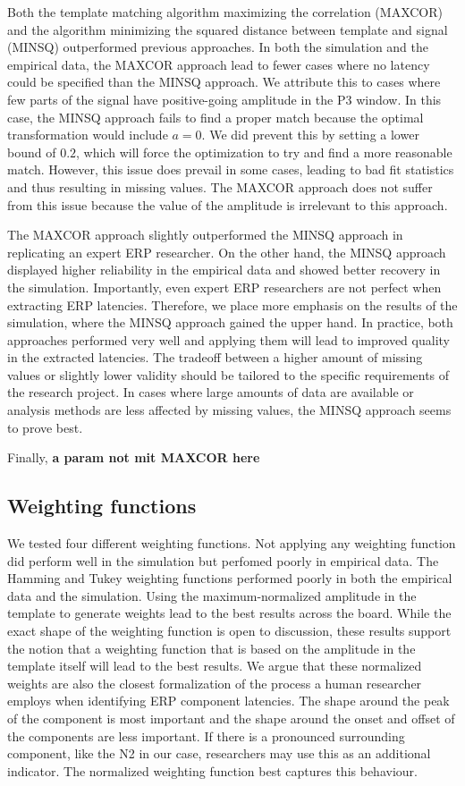 \documentclass[
  man]{apa7}
\begin{document}
Both the template matching algorithm maximizing the correlation (MAXCOR) and the algorithm minimizing the squared distance between template and signal (MINSQ) outperformed previous approaches. In both the simulation and the empirical data, the MAXCOR approach lead to fewer cases where no latency could be specified than the MINSQ approach. We attribute this to cases where few parts of the signal have positive-going amplitude in the P3 window. In this case, the MINSQ approach fails to find a proper match because the optimal transformation would include \(a = 0\). We did prevent this by setting a lower bound of \(0.2\), which will force the optimization to try and find a more reasonable match. However, this issue does prevail in some cases, leading to bad fit statistics and thus resulting in missing values. The MAXCOR approach does not suffer from this issue because the value of the amplitude is irrelevant to this approach.

The MAXCOR approach slightly outperformed the MINSQ approach in replicating an expert ERP researcher. On the other hand, the MINSQ approach displayed higher reliability in the empirical data and showed better recovery in the simulation. Importantly, even expert ERP researchers are not perfect when extracting ERP latencies. Therefore, we place more emphasis on the results of the simulation, where the MINSQ approach gained the upper hand. In practice, both approaches performed very well and applying them will lead to improved quality in the extracted latencies. The tradeoff between a higher amount of missing values or slightly lower validity should be tailored to the specific requirements of the research project. In cases where large amounts of data are available or analysis methods are less affected by missing values, the MINSQ approach seems to prove best.

Finally, \textbf{a param not mit MAXCOR here}

\hypertarget{weighting-functions}{%
\subsection{Weighting functions}\label{weighting-functions}}

We tested four different weighting functions. Not applying any weighting function did perform well in the simulation but perfomed poorly in empirical data. The Hamming and Tukey weighting functions performed poorly in both the empirical data and the simulation. Using the maximum-normalized amplitude in the template to generate weights lead to the best results across the board. While the exact shape of the weighting function is open to discussion, these results support the notion that a weighting function that is based on the amplitude in the template itself will lead to the best results. We argue that these normalized weights are also the closest formalization of the process a human researcher employs when identifying ERP component latencies. The shape around the peak of the component is most important and the shape around the onset and offset of the components are less important. If there is a pronounced surrounding component, like the N2 in our case, researchers may use this as an additional indicator. The normalized weighting function best captures this behaviour.
\end{document}
